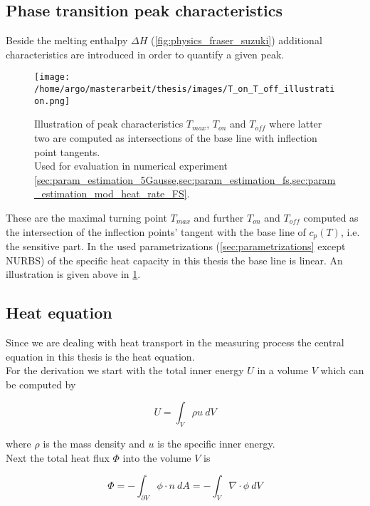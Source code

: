 \documentclass{scrartcl}[12pt, halfparskip]
\numberwithin{equation}{section}
\numberwithin{figure}{section}
\numberwithin{table}{section}
\begin{document}
\subsection{Phase transition peak characteristics}
Beside the melting enthalpy $\Delta H$ (\cref{fig:physics_fraser_suzuki}) additional characteristics are introduced in order to quantify a given peak.


\begin{figure}[H]
	\centering
	\texttt{[image: /home/argo/masterarbeit/thesis/images/T\_on\_T\_off\_illustration.png]}
	\caption{Illustration of peak characteristics $T_{max}$, $T_{on}$ and $T_{off}$ where latter two are computed as intersections of the base line with inflection point tangents. \\
	Used for evaluation in numerical experiment \cref{sec:param_estimation_5Gausse,sec:param_estimation_fs,sec:param_estimation_mod_heat_rate_FS}.}
	\label{fig:T_on/off_illustration}
\end{figure}

These are the maximal turning point $T_{max}$ and further $T_{on}$ and $T_{off}$ computed as the intersection of the inflection points' tangent with the base line of $c_p(T)$, i.e. the sensitive part. In the used parametrizations (\cref{sec:parametrizations} except NURBS) of the specific heat capacity in this thesis the base line is linear. An illustration is given above in \cref{fig:T_on/off_illustration}.


\subsection{Heat equation}
\label{sec:heat_equation}

Since we are dealing with heat transport in the measuring process the central equation in this thesis is the heat equation. \\
For the derivation \cite{lit:waerme_und_stoffuebertragung}
we start with the total inner energy $U$ in a volume $V$ which can be computed by

\begin{equation}
	U = \int_{V} \rho u \ dV
\end{equation}

where $\rho$ is the mass density and $u$ is the specific inner energy. \\
Next the total heat flux $\varPhi$ into the volume $V$ is

\begin{equation}
	\varPhi = - \int_{\partial V} \phi \cdot n \ dA = - \int_{V} \nabla \cdot \phi \ dV
\end{equation}
\end{document}
